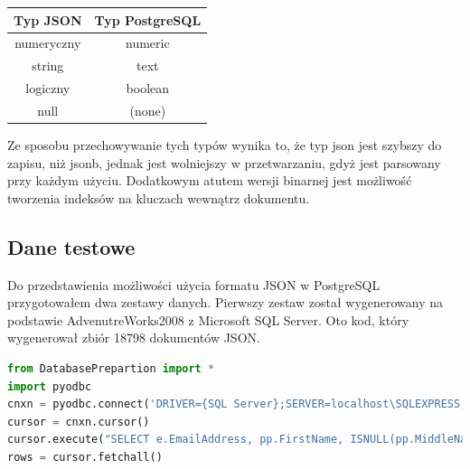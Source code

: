 \documentclass[a4paper,12pt,table]{article}
\begin{document}
{\begin{center}
  \begin{tabular}{ | c | c | }
    \hline
    \textbf{Typ JSON} & \textbf{Typ PostgreSQL} \\ \hline
    numeryczny & numeric \\ \hline
   	string & text  \\ \hline
    logiczny & boolean\\ \hline
    null & (none)\\ 
    \hline
    \end{tabular}
\end{center}
\setlength{\parskip}{2\bigskipamount plus \smallskipamount minus \smallskipamount}
Ze sposobu przechowywanie tych typów wynika to, że typ json jest szybszy do zapisu, niż jsonb, jednak jest wolniejszy w przetwarzaniu, gdyż jest parsowany przy każdym użyciu. Dodatkowym atutem wersji binarnej jest możliwość tworzenia indeksów na kluczach wewnątrz dokumentu. \cite{p}
\subsection{Dane testowe}
Do przedstawienia możliwości użycia formatu JSON w PostgreSQL przygotowałem dwa zestawy danych. Pierwszy zestaw został wygenerowany na podstawie AdvenutreWorks2008 z Microsoft SQL Server. Oto kod, który wygenerował zbiór 18798 dokumentów JSON. 
\begin{lstlisting}[language=Python]
from DatabasePrepartion import *
import pyodbc 
cnxn = pyodbc.connect('DRIVER={SQL Server};SERVER=localhost\SQLEXPRESS;DATABASE=AdventureWorks2008;')
cursor = cnxn.cursor()
cursor.execute("SELECT e.EmailAddress, pp.FirstName, ISNULL(pp.MiddleName,'') AS MiddleName, pp.LastName, p.BusinessEntityID,[AddressLine1],ISNULL([AddressLine2],'') AS AddressLine2,[City],[PostalCode] FROM [AdventureWorks2008].[Person].[Address] a,[AdventureWorks2008].[Person].[EmailAddress] e, [AdventureWorks2008].[Person].[BusinessEntityAddress] p, [AdventureWorks2008].[Person].[Person] pp WHERE p.AddressID = a.AddressID and pp.BusinessEntityID=p.BusinessEntityID and e.BusinessEntityID=pp.BusinessEntityID;")
rows = cursor.fetchall()


\end{lstlisting}}
\end{document}
